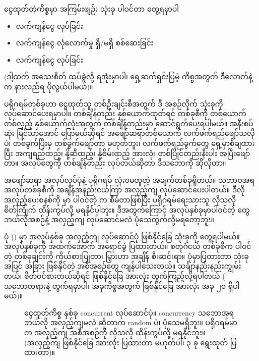 ငွေထုတ်တဲ့ကိစ္စမှာ အကြမ်းဖျဉ်း  သုံးခု ပါဝင်တာ တွေ့ရမှာပါ 
%
\begin{itemize}
    \item လက်ကျန်ငွေ  လုပ်ခြင်း
    \item လက်ကျန်ငွေ လုံလောက်မှု ရှိ/မရှိ စစ်ဆေးခြင်း
    \item လက်ကျန်ငွေ  လုပ်ခြင်း
\end{itemize}
%
(ဒါ့ထက် အသေးစိတ် ထပ်ခွဲလို့ ရအုံးမှာပါ၊ ရှေ့ဆက်ရှင်းပြမဲ့ ကိစ္စအတွက် ဒီလောက်နဲ့က နားလည်ရ ပိုလွယ်ပါမယ်)။

 ပရိုဂရမ်တစ်ခုဟာ ငွေထုတ်သူ တစ်ဦးချင်းစီအတွက် ဒီ အစဉ်လိုက်  သုံးခုကို လုပ်ဆောင်ပေးရမှာပါ။ တစ်ချိန်တည်း နှစ်ယောက်ထုတ်ရင်  တစ်ခုစီကို တစ်ယောက် တစ်လှည့် နှစ်ယောက်လုံးအတွက် တစ်ချိန်တည်းမှာ ဆောင်ရွက်ပေးရပါမယ်။ အနီးစပ်ဆုံး မြင်သာအောင် ပြောမယ်ဆိုရင်  အဖျော်ဆရာတစ်ယောက် လက်ဖက်ရည်ဖျော်သလိုပဲ၊ တစ်ခွက်ပြီးမှ တစ်ခွက်ဖျော်တာ မဟုတ်ဘူး၊ လက်ဖက်ရည်ခွက်တွေ ရှေ့မှာစီချထားပြီး အကျရည်ထည့်၊ နို့ဆီထည့်၊ နို့စိမ်းထည့် အားလုံး တစ်ပြိုင်တည်းနီးပါး အပြီးဖျော်တာ။ အလုပ်တွေကို တစ်ချိန်တည်း လုပ်တယ်ဆိုတာ ဒီသဘောကို ဆိုလိုတာ။ 

အဖျော်ဆရာ အလုပ်လုပ်ပုံနဲ့  ပရိုဂရမ် လုံးဝမတူတဲ့ အချက်တစ်ခုရှိတယ်။  သဘာဝအရ အလုပ်တစ်ခုစီကို အချိန်အနည်းငယ်ကြာ အလှည့်ကျ လုပ်ဆောင်ပေးပါတယ်။ ဒီလို အလှည့်ပေးစနစ်ကို  မှာ ပါဝင်တဲ့  က  စီမံတာဖြစ်ပြီး ပရိုဂရမ်ရေးသားသူ လိုသလို စိတ်ကြိုက် ထိန်းကွပ်လို့ မရနိုင်ပါဘူး။ ဒီအတွက်ကြောင့် အလုပ်နှစ်ခုမှာပါဝင်တဲ့  တွေ ဘယ်လိုအစဉ်နဲ့ အလှည့်ကျ လုပ်ဆောင်မလဲ ပုံသေတွက်လို့မရတော့ဘူး။  

ပုံ (\fRefNo{\ref{fig:accwithdrawconcur1}}) မှာ အလုပ်နှစ်ခု အလှည့်ကျ လုပ်ဆောင်ပုံ ဖြစ်နိုင်ခြေ သုံးခုကို တွေ့ရပါမယ်။ အလုပ်နှစ်ခုကို အထက်အောက် အရောင်ခွဲ ပြထားတယ်။ စတုဂံငယ် တစ်ခုစီက ပါဝင်တဲ့  တစ်ခုချင်းကို ကိုယ်စားပြုတာ၊ မြှားဟာ အချိန် စီးဆင်းရာ။ ပုံမှာပြထားတာ သုံးခုအပြင် အခြား ဖြစ်နိုင်တဲ့ အစီအစဉ်တွေ ကျန်ပါသေးတယ်။ သင်္ချာနည်းနည်းကျွမ်းတယ်၊ စိတ်ဝင်စားတယ်ဆိုရင် ဖြစ်နိုင်ခြေ အားလုံး တွက်ကြည့်လို့ရပါတယ် (   သဘောတရားနဲ့ တွက်ရမှာပါ၊ အခုကိစ္စအတွက် ဖြစ်နိုင်ခြေ အားလုံး အခု ၂၀ ရှိပါမယ်)။


\begin{figure}[H]
    \caption{ငွေထုတ်ကိစ္စ နှစ်ခု concurrent လုပ်ဆောင်ပုံ။ concurrency သဘောအရ ဘယ်လို အလှည့်ကျမလဲ ဆိုတာက random ပဲ၊ ပုံသေမရှိဘူး။ ပရိုဂရမ်မာက အလှည့်ကျ အစီအစဉ်ကို လိုသလို ထိန်းကွပ်လို့ မရနိုင်ဘူး။ (အလှည့်ကျ ဖြစ်နိုင်ခြေ အားလုံး ပြထားတာ မဟုတ်ပါ၊ ၃ ခု ရွေးထုတ် ပြထားတာ)။}
    \label{fig:accwithdrawconcur1}
\end{figure}

